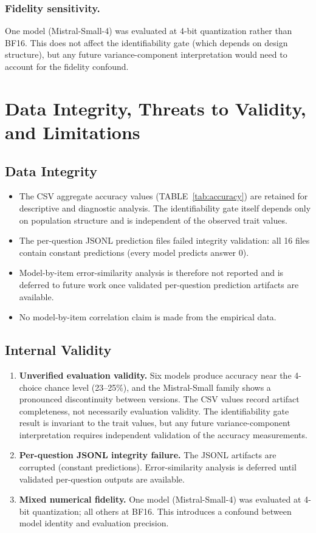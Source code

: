 \documentclass{ieeeaccess}
\theoremstyle{definition}
\theoremstyle{plain}
\begin{document}
\subsubsection{Fidelity sensitivity.} One model (Mistral-Small-4) was evaluated at 4-bit quantization rather than BF16. This does not affect the identifiability gate (which depends on design structure), but any future variance-component interpretation would need to account for the fidelity confound.

\section{Data Integrity, Threats to Validity, and Limitations}
\label{sec:threats}

\subsection{Data Integrity}
\begin{itemize}
\item The CSV aggregate accuracy values (TABLE~\ref{tab:accuracy}) are retained for descriptive and diagnostic analysis. The identifiability gate itself depends only on population structure and is independent of the observed trait values.
\item The per-question JSONL prediction files failed integrity validation: all 16 files contain constant predictions (every model predicts answer 0).
\item Model-by-item error-similarity analysis is therefore not reported and is deferred to future work once validated per-question prediction artifacts are available.
\item No model-by-item correlation claim is made from the empirical data.
\end{itemize}

\subsection{Internal Validity}
\begin{enumerate}
\item \textbf{Unverified evaluation validity.} Six models produce accuracy near the 4-choice chance level (23--25\%), and the Mistral-Small family shows a pronounced discontinuity between versions. The CSV values record artifact completeness, not necessarily evaluation validity. The identifiability gate result is invariant to the trait values, but any future variance-component interpretation requires independent validation of the accuracy measurements.
\item \textbf{Per-question JSONL integrity failure.} The JSONL artifacts are corrupted (constant predictions). Error-similarity analysis is deferred until validated per-question outputs are available.
\item \textbf{Mixed numerical fidelity.} One model (Mistral-Small-4) was evaluated at 4-bit quantization; all others at BF16. This introduces a confound between model identity and evaluation precision.
\end{enumerate}
\end{document}
